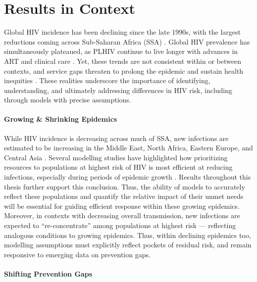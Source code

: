 \section{Results in Context}\label{conc.context}
Global HIV incidence has been declining since the late 1990s,
with the largest reductions coming across Sub-Saharan Africa (SSA) \cite{Joshi2021,AIDSinfo}.
Global HIV prevalence has simultaneously plateaued,
as PLHIV continue to live longer with advances in ART and clinical care \cite{AIDSinfo}.
Yet, these trends are not consistent within or between contexts,
and service gaps threaten to prolong the epidemic and sustain health inequities
\cite{Akullian2017,Tanser2018,Ortblad2019,Barr2021,Joshi2021,AIDSinfo}.
These realities underscore the importance of
identifying, understanding, and ultimately addressing differences in HIV risk,
including through models with precise assumptions.
\paragraph{Growing \& Shrinking Epidemics}
While HIV incidence is decreasing across much of SSA, new infections are estimated to be
increasing in the Middle East, North Africa, Eastern Europe, and Central Asia \cite{AIDSinfo}.
Several modelling studies have highlighted how
prioritizing resources to populations at highest risk of HIV
is most efficient at reducing infections,
especially during periods of epidemic growth \cite{Boily2002,Silhol2021,Stone2021}.
Results throughout this thesis further support this conclusion.
Thus, the ability of models to accurately reflect these populations
and quantify the relative impact of their unmet needs
will be essential for guiding efficient response within these growing epidemics.
Moreover, in contexts with decreasing overall transmission,
new infections are expected to ``re-concentrate'' among populations at highest risk
\cite{Akullian2017,Ortblad2019,Barr2021,Joshi2021}
--- reflecting analogous conditions to growing epidemics.
Thus, within declining epidemics too,
modelling assumptions must explicitly reflect pockets of residual risk,
and remain responsive to emerging data on prevention gaps.
\paragraph{Shifting Prevention Gaps}
